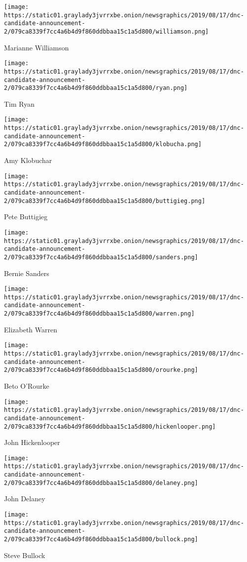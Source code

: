 \texttt{[image: https://static01.graylady3jvrrxbe.onion/newsgraphics/2019/08/17/dnc-candidate-announcement-2/079ca8339f7cc4a6b4d9f860ddbbaa15c1a5d800/williamson.png]}

Marianne Williamson

\texttt{[image: https://static01.graylady3jvrrxbe.onion/newsgraphics/2019/08/17/dnc-candidate-announcement-2/079ca8339f7cc4a6b4d9f860ddbbaa15c1a5d800/ryan.png]}

Tim Ryan

\texttt{[image: https://static01.graylady3jvrrxbe.onion/newsgraphics/2019/08/17/dnc-candidate-announcement-2/079ca8339f7cc4a6b4d9f860ddbbaa15c1a5d800/klobucha.png]}

Amy Klobuchar

\texttt{[image: https://static01.graylady3jvrrxbe.onion/newsgraphics/2019/08/17/dnc-candidate-announcement-2/079ca8339f7cc4a6b4d9f860ddbbaa15c1a5d800/buttigieg.png]}

Pete Buttigieg

\texttt{[image: https://static01.graylady3jvrrxbe.onion/newsgraphics/2019/08/17/dnc-candidate-announcement-2/079ca8339f7cc4a6b4d9f860ddbbaa15c1a5d800/sanders.png]}

Bernie Sanders

\texttt{[image: https://static01.graylady3jvrrxbe.onion/newsgraphics/2019/08/17/dnc-candidate-announcement-2/079ca8339f7cc4a6b4d9f860ddbbaa15c1a5d800/warren.png]}

Elizabeth Warren

\texttt{[image: https://static01.graylady3jvrrxbe.onion/newsgraphics/2019/08/17/dnc-candidate-announcement-2/079ca8339f7cc4a6b4d9f860ddbbaa15c1a5d800/orourke.png]}

Beto O'Rourke

\texttt{[image: https://static01.graylady3jvrrxbe.onion/newsgraphics/2019/08/17/dnc-candidate-announcement-2/079ca8339f7cc4a6b4d9f860ddbbaa15c1a5d800/hickenlooper.png]}

John Hickenlooper

\texttt{[image: https://static01.graylady3jvrrxbe.onion/newsgraphics/2019/08/17/dnc-candidate-announcement-2/079ca8339f7cc4a6b4d9f860ddbbaa15c1a5d800/delaney.png]}

John Delaney

\texttt{[image: https://static01.graylady3jvrrxbe.onion/newsgraphics/2019/08/17/dnc-candidate-announcement-2/079ca8339f7cc4a6b4d9f860ddbbaa15c1a5d800/bullock.png]}

Steve Bullock

